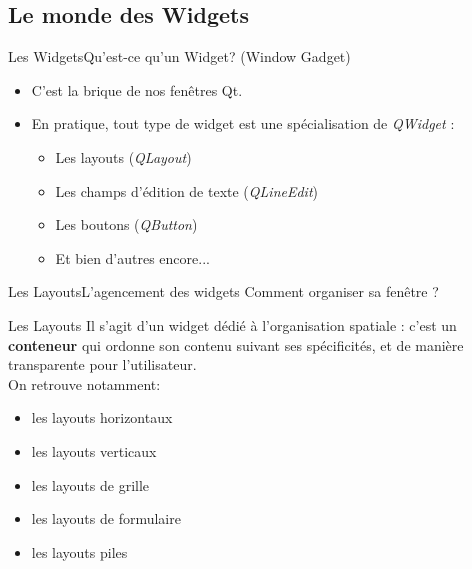 \documentclass[12pt]{beamer}
\begin{document}
    \subsection{Le monde des Widgets} 
            \begin{frame}{Les Widgets}{Qu'est-ce qu'un Widget? (Window Gadget)}
                \begin{itemize}
                    \item{C'est la brique de nos fenêtres Qt.}
                    \item{En pratique, tout type de widget est une spécialisation de \textit{QWidget} :}
                    \begin{itemize}
                        \item{Les layouts (\textit{QLayout})}
                        \item{Les champs d'édition de texte (\textit{QLineEdit})}
                        \item{Les boutons (\textit{QButton})}
                        \item{Et bien d'autres encore...}
                    \end{itemize}
                \end{itemize}
            \end{frame}

    
            \begin{frame}{Les Layouts}{L'agencement des widgets}
                Comment organiser sa fenêtre ?
                \begin{block}{Les Layouts}
                    Il s'agit d'un widget dédié à l'organisation spatiale : c'est un \textbf{conteneur} qui ordonne son contenu suivant ses spécificités, et de manière transparente pour l'utilisateur.\\On retrouve notamment:
                    \begin{itemize}
                      \item{les layouts horizontaux }
                      \item{les layouts verticaux}
                      \item{les layouts de grille}
                       \item{les layouts de formulaire}
                       \item{les layouts piles}
                 \end{itemize}
                \end{block}
            \end{frame} 
            
\end{document}
